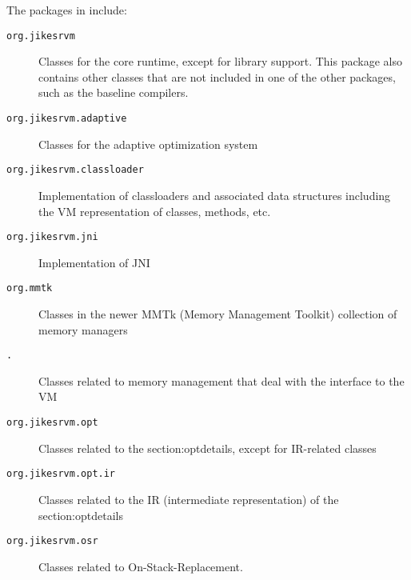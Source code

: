 The packages in \jrvm{} include:
\begin{description}
\item[\texttt{org.jikesrvm}] Classes for the core runtime, except for library
support.  This package also contains other classes that are not
included in one of the other packages, such as the baseline compilers. 

\item[\texttt{org.jikesrvm.adaptive}] Classes for the adaptive optimization system

\item[\texttt{org.jikesrvm.classloader}] Implementation of classloaders
and associated data structures including the VM representation of classes,
methods, etc. 

\item[\texttt{org.jikesrvm.jni}] Implementation of JNI

\item[\texttt{org.mmtk}] Classes in the newer MMTk
(Memory Management Toolkit) collection of memory managers

\item[\texttt{\MMpackage\-.\mminterface{}}] Classes related to
memory management that deal with the interface to the VM

\item[\texttt{org.jikesrvm.opt}] Classes related to
the %
{section:optdetails}, except for IR-related classes

\item[\texttt{org.jikesrvm.opt.ir}] Classes related to the IR
(intermediate representation) of the %
{section:optdetails}

\item[\texttt{org.jikesrvm.osr}] Classes related to On-Stack-Replacement. 


\end{description}
